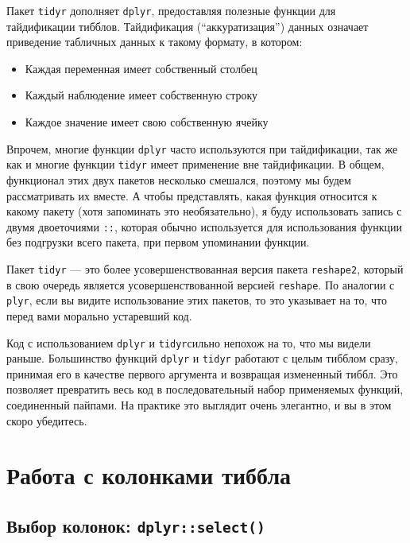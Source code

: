 \documentclass[]{book}
\providecommand{\tightlist}{%
  \setlength{\itemsep}{0pt}\setlength{\parskip}{0pt}}
\begin{document}
Пакет \texttt{tidyr} дополняет \texttt{dplyr}, предоставляя полезные
функции для тайдификации тибблов. Тайдификация (``аккуратизация'')
данных означает приведение табличных данных к такому формату, в котором:

\begin{itemize}
\tightlist
\item
  Каждая переменная имеет собственный столбец
\item
  Каждый наблюдение имеет собственную строку
\item
  Каждое значение имеет свою собственную ячейку
\end{itemize}

Впрочем, многие функции \texttt{dplyr} часто используются при
тайдификации, так же как и многие функции \texttt{tidyr} имеет
применение вне тайдификации. В общем, функционал этих двух пакетов
несколько смешался, поэтому мы будем рассматривать их вместе. А чтобы
представлять, какая функция относится к какому пакету (хотя запоминать
это необязательно), я буду использовать запись с двумя двоеточиями
\texttt{::}, которая обычно используется для использования функции без
подгрузки всего пакета, при первом упоминании функции.

Пакет \texttt{tidyr} --- это более усовершенствованная версия пакета
\texttt{reshape2}, который в свою очередь является усовершенствованной
версией \texttt{reshape}. По аналогии с \texttt{plyr}, если вы видите
использование этих пакетов, то это указывает на то, что перед вами
морально устаревший код.

Код с использованием \texttt{dplyr} и \texttt{tidyr}сильно непохож на
то, что мы видели раньше. Большинство функций \texttt{dplyr} и
\texttt{tidyr} работают с целым тибблом сразу, принимая его в качестве
первого аргумента и возвращая измененный тиббл. Это позволяет превратить
весь код в последовательный набор применяемых функций, соединенный
пайпами. На практике это выглядит очень элегантно, и вы в этом скоро
убедитесь.

\section{Работа с колонками тиббла}\label{tidy_select_cols}

\subsection{\texorpdfstring{Выбор колонок:
\texttt{dplyr::select()}}{Выбор колонок: dplyr::select()}}\label{ux432ux44bux431ux43eux440-ux43aux43eux43bux43eux43dux43eux43a-dplyrselect}
\end{document}

